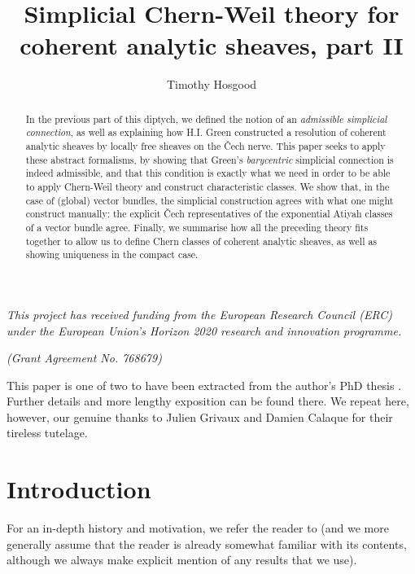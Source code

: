 \documentclass[11pt,fleqn]{article}
\title{Simplicial Chern-Weil theory for coherent analytic sheaves, part II}
\author{Timothy Hosgood}
\theoremstyle{plain}
\theoremstyle{definition}
\theoremstyle{remark}
\numberwithin{equation}{theorem}
\begin{document}
\maketitle

\begin{abstract}
    In the previous part of this diptych, we defined the notion of an \emph{admissible simplicial connection}, as well as explaining how H.I. Green constructed a resolution of coherent analytic sheaves by locally free sheaves on the Čech nerve.
    This paper seeks to apply these abstract formalisms, by showing that Green's \emph{barycentric} simplicial connection is indeed admissible, and that this condition is exactly what we need in order to be able to apply Chern-Weil theory and construct characteristic classes.
    We show that, in the case of (global) vector bundles, the simplicial construction agrees with what one might construct manually: the explicit Čech representatives of the exponential Atiyah classes of a vector bundle agree.
    Finally, we summarise how all the preceding theory fits together to allow us to define Chern classes of coherent analytic sheaves, as well as showing uniqueness in the compact case.
\end{abstract}

\tableofcontents

\bigskip

\begin{center}
    \emph{This project has received funding from the European Research Council (ERC) under the European Union’s Horizon 2020 research and innovation programme.}

    \emph{(Grant Agreement No. 768679)}
\end{center}

\medskip

{This paper is one of two to have been extracted from the author's PhD thesis \cite{Hosgood2020}. Further details and more lengthy exposition can be found there. We repeat here, however, our genuine thanks to Julien Grivaux and Damien Calaque for their tireless tutelage.}

\section{Introduction}

    For an in-depth history and motivation, we refer the reader to \cite[§1]{Hosgood2020a} (and we more generally assume that the reader is already somewhat familiar with its contents, although we always make explicit mention of any results that we use).
\end{document}
